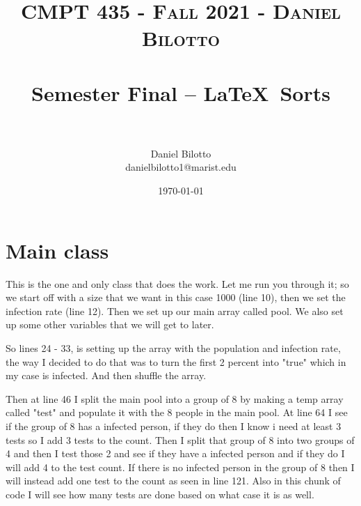 \documentclass[letterpaper, 10pt]{article}
\title{	
   \normalfont \normalsize 
   \textsc{CMPT 435 - Fall 2021 - Daniel Bilotto} \\[10pt] %
   \horrule{0.5pt} \\[0.25cm] 	%
   \huge Semester Final -- \LaTeX ~Sorts \\     	    %
   \horrule{0.5pt} \\[0.25cm] 	%
}
\author{Daniel Bilotto \\ \normalsize danielbilotto1@marist.edu}
\date{\normalsize\today} 	%
\begin{document}
\maketitle %



\section{Main class}
This is the one and only class that does the work. Let me run you through it; so we start off with a size that we want in this case 1000 (line 10), then we set the infection rate (line 12). Then we set up our main array called pool. We also set up some other variables that we will get to later. \par

So lines 24 - 33, is setting up the array with the population and infection rate, the way I decided to do that was to turn the first 2 percent into "true" which in my case is infected. And then shuffle the array. \par

Then at line 46 I split the main pool into a group of 8 by making a temp array called "test" and populate it with the 8 people in the main pool. At line 64 I see if the group of 8 has a infected person, if they do then I know i need at least 3 tests so I add 3 tests to the count. Then I split that group of 8 into two groups of 4 and then I test those 2 and see if they have a infected person and if they do I will add 4 to the test count. If there is no infected person in the group of 8 then I will instead add one test to the count as seen in line 121. Also in this chunk of code I will see how many tests are done based on what case it is as well.\par
\end{document}

